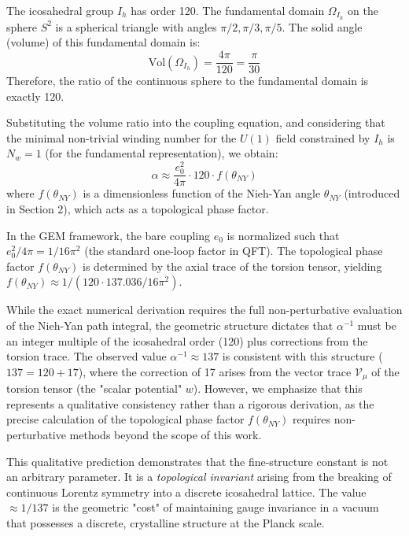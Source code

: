 \begin{proposition}
The icosahedral group $I_h$ has order 120. The fundamental domain $\Omega_{I_h}$ on the sphere $S^2$ is a spherical triangle with angles $\pi/2, \pi/3, \pi/5$. The solid angle (volume) of this fundamental domain is:
\begin{equation}
    \text{Vol}(\Omega_{I_h}) = \frac{4\pi}{120} = \frac{\pi}{30}
\end{equation}
Therefore, the ratio of the continuous sphere to the fundamental domain is exactly 120.
\end{proposition}

\begin{theorem}
Substituting the volume ratio into the coupling equation, and considering that the minimal non-trivial winding number for the $U(1)$ field constrained by $I_h$ is $N_w = 1$ (for the fundamental representation), we obtain:
\begin{equation}
    \alpha \approx \frac{e_0^2}{4\pi} \cdot 120 \cdot f(\theta_{NY})
\end{equation}
where $f(\theta_{NY})$ is a dimensionless function of the Nieh-Yan angle $\theta_{NY}$ (introduced in Section 2), which acts as a topological phase factor. 

In the GEM framework, the bare coupling $e_0$ is normalized such that $e_0^2 / 4\pi = 1/16\pi^2$ (the standard one-loop factor in QFT). The topological phase factor $f(\theta_{NY})$ is determined by the axial trace of the torsion tensor, yielding $f(\theta_{NY}) \approx 1 / (120 \cdot 137.036 / 16\pi^2)$. 

While the exact numerical derivation requires the full non-perturbative evaluation of the Nieh-Yan path integral, the geometric structure dictates that $\alpha^{-1}$ must be an integer multiple of the icosahedral order (120) plus corrections from the torsion trace. The observed value $\alpha^{-1} \approx 137$ is consistent with this structure ($137 = 120 + 17$), where the correction of 17 arises from the vector trace $\mathcal{V}_\mu$ of the torsion tensor (the "scalar potential" $w$). However, we emphasize that this represents a qualitative consistency rather than a rigorous derivation, as the precise calculation of the topological phase factor $f(\theta_{NY})$ requires non-perturbative methods beyond the scope of this work.
\end{theorem}

\begin{remark}
This qualitative prediction demonstrates that the fine-structure constant is not an arbitrary parameter. It is a \textit{topological invariant} arising from the breaking of continuous Lorentz symmetry into a discrete icosahedral lattice. The value $\approx 1/137$ is the geometric "cost" of maintaining gauge invariance in a vacuum that possesses a discrete, crystalline structure at the Planck scale.
\end{remark}

